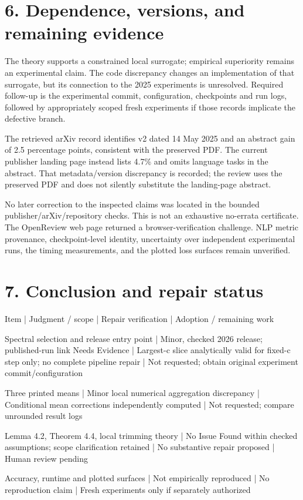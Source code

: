 \documentclass[10pt]{article}
\begin{document}
\section*{6. Dependence, versions, and remaining evidence}
The theory supports a constrained local surrogate; empirical superiority remains an experimental claim. The code discrepancy changes an implementation of that surrogate, but its connection to the 2025 experiments is unresolved. Required follow-up is the experimental commit, configuration, checkpoints and run logs, followed by appropriately scoped fresh experiments if those records implicate the defective branch.\par
The retrieved arXiv record identifies v2 dated 14 May 2025 and an abstract gain of 2.5 percentage points, consistent with the preserved PDF. The current publisher landing page instead lists 4.7\% and omits language tasks in the abstract. That metadata/version discrepancy is recorded; the review uses the preserved PDF and does not silently substitute the landing-page abstract.\par
No later correction to the inspected claims was located in the bounded publisher/arXiv/repository checks. This is not an exhaustive no-errata certificate. The OpenReview web page returned a browser-verification challenge. NLP metric provenance, checkpoint-level identity, uncertainty over independent experimental runs, the timing measurements, and the plotted loss surfaces remain unverified.\par
\section*{7. Conclusion and repair status}
Item | Judgment / scope | Repair verification | Adoption / remaining work\par
Spectral selection and release entry point | Minor, checked 2026 release; published-run link Needs Evidence | Largest-c slice analytically valid for fixed-c step only; no complete pipeline repair | Not requested; obtain original experiment commit/configuration\par
Three printed means | Minor local numerical aggregation discrepancy | Conditional mean corrections independently computed | Not requested; compare unrounded result logs\par
Lemma 4.2, Theorem 4.4, local trimming theory | No Issue Found within checked assumptions; scope clarification retained | No substantive repair proposed | Human review pending\par
Accuracy, runtime and plotted surfaces | Not empirically reproduced | No reproduction claim | Fresh experiments only if separately authorized\par
\end{document}

